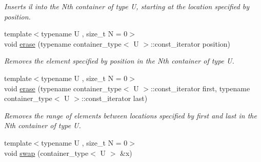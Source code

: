 \begin{DoxyCompactItemize}
\begin{DoxyCompactList}\small\item\em Inserts il into the Nth container of type U, starting at the location specified by position. \end{DoxyCompactList}\item 
\hypertarget{classheterogeneous_1_1heterolist_3_01_t_00_01_types_8_8_8_4_aad32663921635f41705fc477b30aaed8}{}{\footnotesize template$<$typename U , size\+\_\+t N = 0$>$ }\\void \hyperlink{classheterogeneous_1_1heterolist_3_01_t_00_01_types_8_8_8_4_aad32663921635f41705fc477b30aaed8}{erase} (typename container\+\_\+type$<$ U $>$\+::const\+\_\+iterator position)\label{classheterogeneous_1_1heterolist_3_01_t_00_01_types_8_8_8_4_aad32663921635f41705fc477b30aaed8}

\begin{DoxyCompactList}\small\item\em Removes the element specified by position in the Nth container of type U. \end{DoxyCompactList}\item 
\hypertarget{classheterogeneous_1_1heterolist_3_01_t_00_01_types_8_8_8_4_a83ca680d32d897cfde4060b047cb6964}{}{\footnotesize template$<$typename U , size\+\_\+t N = 0$>$ }\\void \hyperlink{classheterogeneous_1_1heterolist_3_01_t_00_01_types_8_8_8_4_a83ca680d32d897cfde4060b047cb6964}{erase} (typename container\+\_\+type$<$ U $>$\+::const\+\_\+iterator first, typename container\+\_\+type$<$ U $>$\+::const\+\_\+iterator last)\label{classheterogeneous_1_1heterolist_3_01_t_00_01_types_8_8_8_4_a83ca680d32d897cfde4060b047cb6964}

\begin{DoxyCompactList}\small\item\em Removes the range of elements between locations specified by first and last in the Nth container of type U. \end{DoxyCompactList}\item 
\hypertarget{classheterogeneous_1_1heterolist_3_01_t_00_01_types_8_8_8_4_ad4633c8288aa34b891f0d28e3e1022bc}{}{\footnotesize template$<$typename U , size\+\_\+t N = 0$>$ }\\void \hyperlink{classheterogeneous_1_1heterolist_3_01_t_00_01_types_8_8_8_4_ad4633c8288aa34b891f0d28e3e1022bc}{swap} (container\+\_\+type$<$ U $>$ \&x)\label{classheterogeneous_1_1heterolist_3_01_t_00_01_types_8_8_8_4_ad4633c8288aa34b891f0d28e3e1022bc}


\end{DoxyCompactItemize}
